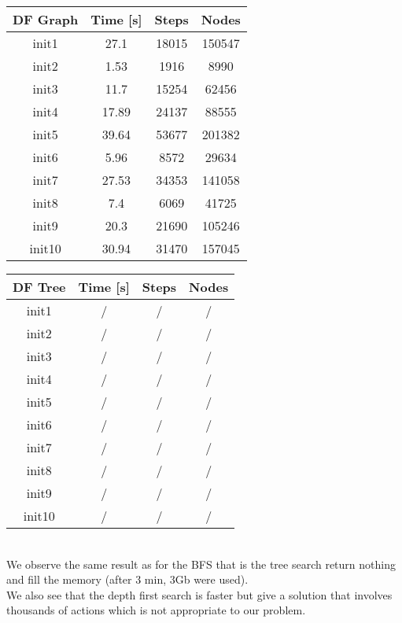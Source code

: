 \documentclass[a4paper,10pt]{article}
\begin{document}
	\begin{tabular}{|c||c|c|c|}
		\hline 
		\textbf{DF Graph} & \textbf{Time [s]} & \textbf{Steps} & \textbf{Nodes} \\ 
		\hline 
		init1 & 27.1 & 18015 & 150547 \\ 
		\hline 
		init2 & 1.53 & 1916 & 8990 \\ 
		\hline 
		init3 & 11.7 & 15254 & 62456 \\ 
		\hline 
		init4 & 17.89 & 24137 & 88555 \\ 
		\hline 
		init5 & 39.64 & 53677 & 201382 \\ 
		\hline 
		init6 & 5.96 & 8572 & 29634 \\ 
		\hline 
		init7 & 27.53 & 34353 & 141058 \\ 
		\hline 
		init8 & 7.4 & 6069 & 41725 \\ 
		\hline 
		init9 & 20.3 & 21690 & 105246 \\ 
		\hline 
		init10 & 30.94 & 31470 & 157045 \\ 
		\hline 
	\end{tabular} 
	\hspace{0.5cm}
	\begin{tabular}{|c||c|c|c|}
		\hline 
		\textbf{DF Tree} & \textbf{Time [s]} & \textbf{Steps} & \textbf{Nodes} \\ 
		\hline 
		init1 & / & / & / \\ 
		\hline 
		init2 & / & / & / \\ 
		\hline 
		init3 & / & / & / \\ 
		\hline 
		init4 & / & / & / \\ 
		\hline 
		init5 & / & / & / \\ 
		\hline 
		init6 & / & / & / \\ 
		\hline 
		init7 & / & / & / \\ 
		\hline 
		init8 & / & / & / \\ 
		\hline 
		init9 & / & / & / \\ 
		\hline 
		init10 & / & / & / \\ 
		\hline 
	\end{tabular}
	\vspace{0.5cm}\\
	We observe the same result as for the BFS that is the tree search return nothing and fill the memory (after 3 min, 3Gb were used).\\
	We also see that the depth first search is faster but give a solution that involves thousands of actions which is not appropriate to our problem.
\end{document}
